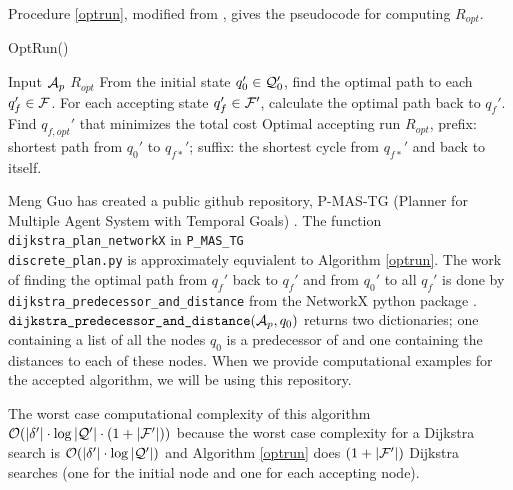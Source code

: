 Procedure \ref{optrun}, modified from \cite{guo15}, gives the pseudocode for computing $R_{opt}$.
\begin{algorithm}
\caption{OptRun()}\label{optrun}
\begin{algorithmic}[1]
\Require Input $\mathcal{A}_p$
\Ensure $R_{opt}$
\State From the initial state $q_0' \in \mathcal{Q}_0'$, find the optimal path to each $q_f' \in \mathcal{F}$.
\State For each accepting state $q_f' \in \mathcal{F}'$, calculate the optimal path back to $q_f'$. 
\State Find $q_{f,opt}'$ that minimizes the total cost
\State Optimal accepting run $R_{opt}$, prefix: shortest path from $q_{0}'$ to  $q_{f*}'$; suffix: the shortest cycle from $q_{f*}'$ and back to itself.
\end{algorithmic}
\end{algorithm}

Meng Guo has created a public github repository, P-MAS-TG (Planner for Multiple Agent System with Temporal Goals) \cite{pMasGit}. The function \texttt{dijkstra\_plan\_networkX} in \texttt{P\_MAS\_TG\\discrete\_plan.py} is approximately equvialent to Algorithm \ref{optrun}. The work of finding the optimal path from $q_f'$ back to $q_f'$ and from $q_0'$ to all $q_f'$ is done by \texttt{dijkstra\_predecessor\_and\_distance} from the NetworkX python package \cite{schult08}. $\texttt{dijkstra\_predecessor\_and\_distance}(\mathcal{A}_p,q_0)$ returns two dictionaries; one containing a list of all the nodes $q_0$ is a predecessor of and one containing the distances to each of these nodes. When we provide computational examples for the accepted algorithm, we will be using this repository. %


The worst case computational complexity of this algorithm $\mathcal{O}(|\delta'| \cdot \log|\mathcal{Q}'| \cdot (1 + |\mathcal{F}'|))$ because the worst case complexity for a Dijkstra search is $\mathcal{O}(|\delta'| \cdot \log|\mathcal{Q}'| )$ and Algorithm \ref{optrun} does $(1+ |\mathcal{F}'|)$ Dijkstra searches (one for the initial node and one for each accepting node).

